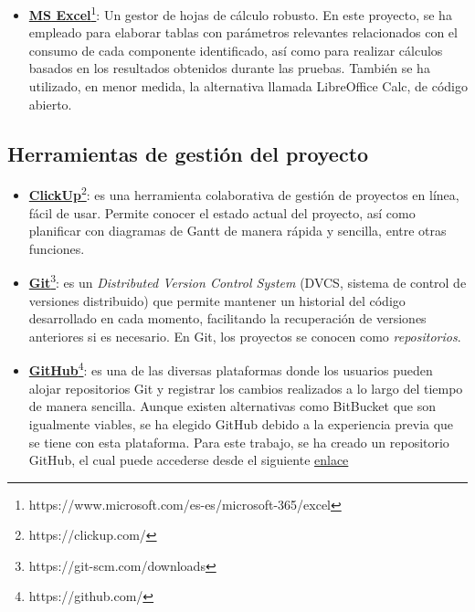 \begin{itemize}
    \item \textbf{\href{https://www.microsoft.com/es-es/microsoft-365/excel}{\ac{MS} Excel}}\footnote{https://www.microsoft.com/es-es/microsoft-365/excel}: Un gestor de hojas de cálculo robusto. En este proyecto, se ha empleado para elaborar tablas con parámetros relevantes relacionados con el consumo de cada componente identificado, así como para realizar cálculos basados en los resultados obtenidos durante las pruebas. También se ha utilizado, en menor medida, la alternativa llamada LibreOffice Calc, de código abierto.

\end{itemize}

\subsection{Herramientas de gestión del proyecto}

\begin{itemize}
    \item \textbf{\href{https://clickup.com/}{ClickUp}}\footnote{https://clickup.com/}: es una herramienta colaborativa de gestión de proyectos en línea, fácil de usar. Permite conocer el estado actual del proyecto, así como planificar con diagramas de Gantt de manera rápida y sencilla, entre otras funciones.
    
    \item \textbf{\href{https://git-scm.com/downloads}{Git}}\footnote{https://git-scm.com/downloads}: es un \textit{Distributed Version Control System} (DVCS, sistema de control de versiones distribuido) que permite mantener un historial del código desarrollado en cada momento, facilitando la recuperación de versiones anteriores si es necesario. En Git, los proyectos se conocen como \emph{repositorios}.
    
    \item \textbf{\href{https://github.com/}{GitHub}}\footnote{https://github.com/}: es una de las diversas plataformas donde los usuarios pueden alojar repositorios Git y registrar los cambios realizados a lo largo del tiempo de manera sencilla. Aunque existen alternativas como BitBucket que son igualmente viables, se ha elegido GitHub debido a la experiencia previa que se tiene con esta plataforma. Para este trabajo, se ha creado un repositorio GitHub, el cual puede accederse desde el siguiente \href{https://github.com/fluctlights/tfm} {enlace}
    
\end{itemize}


